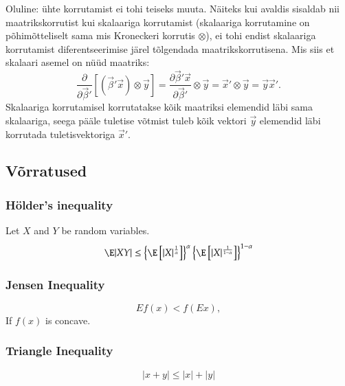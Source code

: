 \documentclass[a4paper]{article}
\numberwithin{equation}{subsection}
\begin{document}
Oluline: ühte korrutamist ei tohi teiseks muuta. Näiteks kui avaldis
sisaldab nii maatrikskorrutist kui skalaariga korrutamist (skalaariga
korrutamine on põhimõtteliselt sama mis Kroneckeri korrutis
$\otimes$), ei tohi endist skalaariga korrutamist diferentseerimise
järel tõlgendada maatrikskorrutisena.  Mis siis et skalaari asemel on
nüüd maatriks:
\begin{equation}
\frac{\partial}{\partial \vec{\beta}'} \left[ ( \vec{\beta}'\vec{x} ) \otimes \vec{y}
  \right] =
  \frac{\partial \vec{\beta}'\vec{x}}{\partial \vec{\beta}'} \otimes \vec{y} =
  \vec{x}' \otimes \vec{y} = \vec{y}\vec{x}'.
\end{equation}
Skalaariga korrutamisel korrutatakse kõik maatriksi elemendid läbi
sama skalaariga, seega pääle tuletise võtmist tuleb kõik vektori $\vec{y}$
elemendid läbi korrutada tuletisvektoriga $\vec{x}'$.


\clearpage
\subsection{Võrratused}


\subsubsection{Hölder's inequality}
Let $X$ and $Y$ be random variables.
\begin{equation}
  \E |XY| 
  \le 
  \left\{ \E \left[ |X|^\frac{1}{\alpha} \right] \right\}^\alpha 
  \left\{ \E \left[ |X|^\frac{1}{1 - \alpha} \right] \right\}^{1 -\alpha}
\end{equation}

\subsubsection{Jensen Inequality}

\begin{equation}
E f(x) < f( Ex),
\end{equation}
If $f(x)$ is concave.


\subsubsection{Triangle Inequality}
\begin{equation}
  |x + y| \le |x| + |y|
\end{equation}

\end{document}
